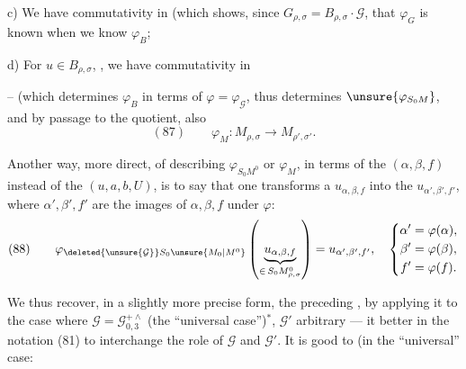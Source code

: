 c) We have commutativity in
(which shows, since $G_{\rho,\sigma}=B_{\rho,\sigma}\cdot\mathcal G$, that $\varphi_G$ is known when we know $\varphi_B$;

d) For $u\in B_{\rho,\sigma}$,  , we have commutativity in


-- (which determines $\varphi_B$ in terms of $\varphi=\varphi_{\mathcal G}$, thus  determines $\unsure{\varphi_{S_0M}}$, and by passage to the quotient, also
\[
 (87)\qquad \varphi_M:M_{\rho,\sigma}\longrightarrow M_{\rho',\sigma'}.
\]

Another way, more direct, of describing $\varphi_{S_0M^0}$ or $\varphi_M$, in terms of the   $(\alpha,\beta,f)$ instead of the $(u,a,b,U)$, is to say that one  transforms a $u_{\alpha,\beta,f}$ into the $u_{\alpha',\beta',f'}$, where $\alpha',\beta',f'$ are the images of $\alpha,\beta,f$ under $\varphi$:
\[
 (88)\qquad
 \varphi_{\deleted{\unsure{\mathcal G}}S_0\unsure{M_0|M^0}}
 \left(\underbrace{u_{\alpha,\beta,f}}_{\in\,S_0M^0_{\rho,\sigma}}\right)
 =u_{\alpha',\beta',f'},\quad
 \left\{\begin{aligned}
 \alpha'&=\varphi(\alpha),\\
 \beta'&=\varphi(\beta),\\
 f'&=\varphi(f).
 \end{aligned}\right.
\]

We thus recover, in a slightly more precise form, the preceding , by  applying it to the case where $\mathcal G=\mathcal G_{0,3}^{+\wedge}$ (the ``universal case'')$^*$, $\mathcal G'$ arbitrary --- it  better in the notation (81) to interchange the role of $\mathcal G$ and $\mathcal G'$.
It is good to  (in the ``universal'' case:

